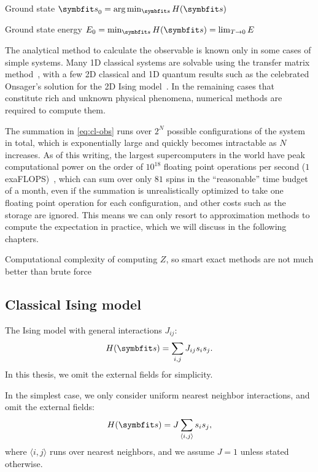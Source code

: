Ground state $\vs_0 = \arg\min_\vs H(\vs)$

Ground state energy $E_0 = \min_\vs H(\vs) = \lim_{T \to 0} E$

The analytical method to calculate the observable is known only in some cases of simple systems. Many 1D classical systems are solvable using the transfer matrix method~\cite{chaikin1995principles5}, with a few 2D classical and 1D quantum results such as the celebrated Onsager's solution for the 2D Ising model~\cite{onsager1944crystal, baxter1995solvable,march2016exactly, caravelli2022some}. In the remaining cases that constitute rich and unknown physical phenomena, numerical methods are required to compute them.

The summation in \cref{eq:cl-obs} runs over $2^N$ possible configurations of the system in total, which is exponentially large and quickly becomes intractable as $N$ increases. As of this writing, the largest supercomputers in the world have peak computational power on the order of $10^{18}$ floating point operations per second ($1$ exaFLOPS)~\cite{kogge2022frontier}, which can sum over only $81$ spins in the ``reasonable'' time budget of a month, even if the summation is unrealistically optimized to take one floating point operation for each configuration, and other costs such as the storage are ignored. This means we can only resort to approximation methods to compute the expectation in practice, which we will discuss in the following chapters.

Computational complexity of computing $Z$, so smart exact methods are not much better than brute force

\subsection{Classical Ising model}

The Ising model with general interactions $J_{i j}$:
\begin{equation}
H(\vs) = \sum_{i, j} J_{i j} s_i s_j.
\label{eq:cl-ising-general}
\end{equation}
In this thesis, we omit the external fields for simplicity.

In the simplest case, we only consider uniform nearest neighbor interactions, and omit the external fields:
\begin{equation}
H(\vs) = J \sum_{\langle i, j \rangle} s_i s_j,
\label{eq:cl-ising}
\end{equation}
where $\langle i, j \rangle$ runs over nearest neighbors, and we assume $J = 1$ unless stated otherwise.

